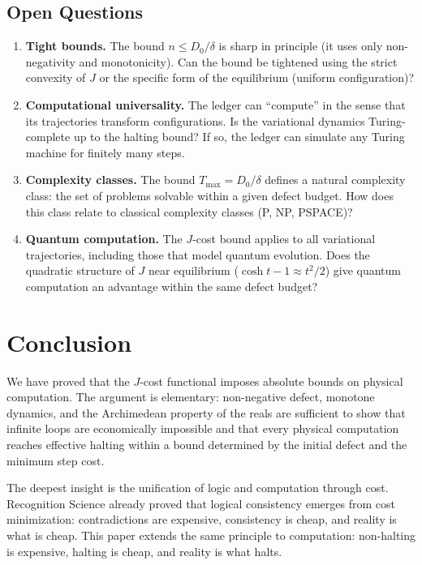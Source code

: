 \documentclass[11pt,a4paper]{article}
\theoremstyle{plain}
\theoremstyle{definition}
\theoremstyle{remark}
\newcommand{\Jcost}{J}
\begin{document}
\subsection{Open Questions}

\begin{enumerate}[nosep]
\item \textbf{Tight bounds.}
The bound $n \le D_0/\delta$ is sharp in principle (it uses only non-negativity and monotonicity).
Can the bound be tightened using the strict convexity of $\Jcost$ or the specific form of the equilibrium (uniform configuration)?

\item \textbf{Computational universality.}
The ledger can ``compute'' in the sense that its trajectories transform configurations.
Is the variational dynamics Turing-complete up to the halting bound?
If so, the ledger can simulate any Turing machine for finitely many steps.

\item \textbf{Complexity classes.}
The bound $T_{\max} = D_0/\delta$ defines a natural complexity class: the set of problems solvable within a given defect budget.
How does this class relate to classical complexity classes (P, NP, PSPACE)?

\item \textbf{Quantum computation.}
The $\Jcost$-cost bound applies to all variational trajectories, including those that model quantum evolution.
Does the quadratic structure of $\Jcost$ near equilibrium ($\cosh t - 1 \approx t^2/2$) give quantum computation an advantage within the same defect budget?
\end{enumerate}

\section{Conclusion}\label{sec:conclusion}

We have proved that the $\Jcost$-cost functional imposes absolute bounds on physical computation.
The argument is elementary: non-negative defect, monotone dynamics, and the Archimedean property of the reals are sufficient to show that infinite loops are economically impossible and that every physical computation reaches effective halting within a bound determined by the initial defect and the minimum step cost.

The deepest insight is the unification of logic and computation through cost.
Recognition Science already proved that logical consistency emerges from cost minimization: contradictions are expensive, consistency is cheap, and reality is what is cheap.
This paper extends the same principle to computation: non-halting is expensive, halting is cheap, and reality is what halts.
\end{document}
